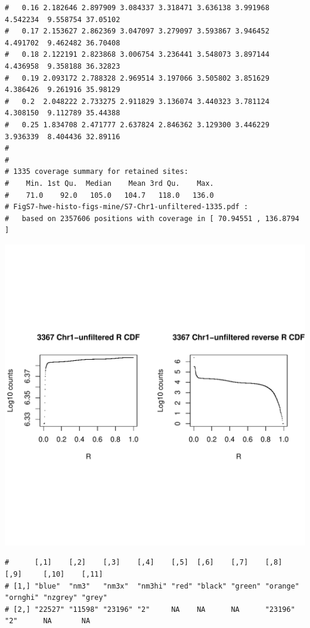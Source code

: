 \documentclass{article}\usepackage[]{graphicx}\usepackage[]{color}
\makeatletter
\def\maxwidth{ %
  \ifdim\Gin@nat@width>\linewidth
    \linewidth
  \else
    \Gin@nat@width
  \fi
}
\newenvironment{kframe}{%
 \def\at@end@of@kframe{}%
 \ifinner\ifhmode%
  \def\at@end@of@kframe{\end{minipage}}%
  \begin{minipage}{\columnwidth}%
 \fi\fi%
 \def\FrameCommand##1{\hskip\@totalleftmargin \hskip-\fboxsep
 \colorbox{shadecolor}{##1}\hskip-\fboxsep
     \hskip-\linewidth \hskip-\@totalleftmargin \hskip\columnwidth}%
 \MakeFramed {\advance\hsize-\width
   \@totalleftmargin\z@ \linewidth\hsize
   \@setminipage}}%
 {\par\unskip\endMakeFramed%
 \at@end@of@kframe}
\newenvironment{knitrout}{}{} %
\makeatother
\begin{document}
\begin{knitrout}
\begin{kframe}
\begin{verbatim}
#   0.16 2.182646 2.897909 3.084337 3.318471 3.636138 3.991968 4.542234  9.558754 37.05102
#   0.17 2.153627 2.862369 3.047097 3.279097 3.593867 3.946452 4.491702  9.462482 36.70408
#   0.18 2.122191 2.823868 3.006754 3.236441 3.548073 3.897144 4.436958  9.358188 36.32823
#   0.19 2.093172 2.788328 2.969514 3.197066 3.505802 3.851629 4.386426  9.261916 35.98129
#   0.2  2.048222 2.733275 2.911829 3.136074 3.440323 3.781124 4.308150  9.112789 35.44388
#   0.25 1.834708 2.471777 2.637824 2.846362 3.129300 3.446229 3.936339  8.404436 32.89116
# 
# 
# 1335 coverage summary for retained sites:
#    Min. 1st Qu.  Median    Mean 3rd Qu.    Max. 
#    71.0    92.0   105.0   104.7   118.0   136.0 
# FigS7-hwe-histo-figs-mine/S7-Chr1-unfiltered-1335.pdf :
#   based on 2357606 positions with coverage in [ 70.94551 , 136.8794 ]
\end{verbatim}
\end{kframe}
\includegraphics[width=\maxwidth]{FigS7-hwe-histo-figs-knitr/unnamed-chunk-10-26} 
\begin{kframe}\begin{verbatim}
#      [,1]    [,2]    [,3]    [,4]    [,5]  [,6]    [,7]    [,8]     [,9]     [,10]    [,11] 
# [1,] "blue"  "nm3"   "nm3x"  "nm3hi" "red" "black" "green" "orange" "ornghi" "nzgrey" "grey"
# [2,] "22527" "11598" "23196" "2"     NA    NA      NA      "23196"  "2"      NA       NA    

\end{verbatim}
\end{kframe}
\end{knitrout}
\end{document}
